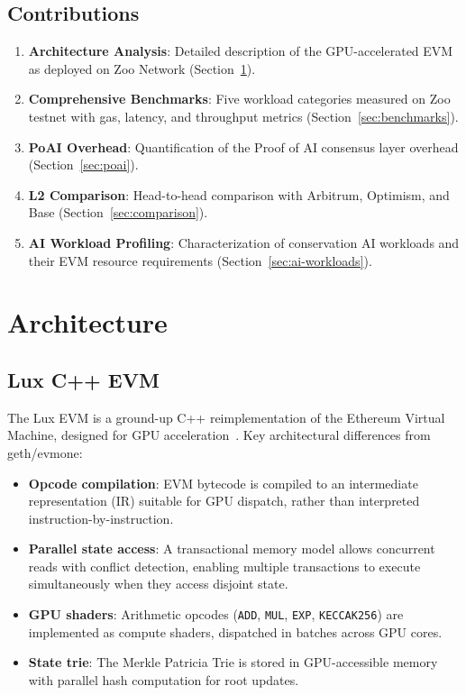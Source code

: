 \documentclass[11pt,letterpaper]{article}
\begin{document}
\subsection{Contributions}

\begin{enumerate}
    \item \textbf{Architecture Analysis}: Detailed description of the GPU-accelerated EVM as deployed on Zoo Network (Section~\ref{sec:architecture}).

    \item \textbf{Comprehensive Benchmarks}: Five workload categories measured on Zoo testnet with gas, latency, and throughput metrics (Section~\ref{sec:benchmarks}).

    \item \textbf{PoAI Overhead}: Quantification of the Proof of AI consensus layer overhead (Section~\ref{sec:poai}).

    \item \textbf{L2 Comparison}: Head-to-head comparison with Arbitrum, Optimism, and Base (Section~\ref{sec:comparison}).

    \item \textbf{AI Workload Profiling}: Characterization of conservation AI workloads and their EVM resource requirements (Section~\ref{sec:ai-workloads}).
\end{enumerate}

\section{Architecture}
\label{sec:architecture}

\subsection{Lux C++ EVM}

The Lux EVM is a ground-up C++ reimplementation of the Ethereum Virtual Machine, designed for GPU acceleration~\cite{lux-evmgpu-benchmark}. Key architectural differences from geth/evmone:

\begin{itemize}
    \item \textbf{Opcode compilation}: EVM bytecode is compiled to an intermediate representation (IR) suitable for GPU dispatch, rather than interpreted instruction-by-instruction.
    \item \textbf{Parallel state access}: A transactional memory model allows concurrent reads with conflict detection, enabling multiple transactions to execute simultaneously when they access disjoint state.
    \item \textbf{GPU shaders}: Arithmetic opcodes (\texttt{ADD}, \texttt{MUL}, \texttt{EXP}, \texttt{KECCAK256}) are implemented as compute shaders, dispatched in batches across GPU cores.
    \item \textbf{State trie}: The Merkle Patricia Trie is stored in GPU-accessible memory with parallel hash computation for root updates.
\end{itemize}
\end{document}
